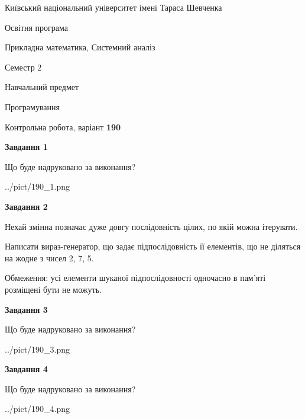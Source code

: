 \documentclass[12pt, ukrainian]{article}
\begin{document}
{{\begin {small}\par
{ \center  Київський національний університет імені Тараса Шевченка \par}
{\parbox {5 cm}{Освітня програма \hfill}{\parbox {8 cm}{Прикладна математика, Системний аналіз \hfill}}\parbox {5 cm}{\hfill Семестр 2}}\par
{\parbox {5 cm} {Навчальний предмет \hfill}\parbox {7 cm}{Програмування \hfill}\parbox {6cm}{\hfill}\par}\vspace{-7pt} \end{small}}{\center Контрольна робота, варіант  \No \textbf
{ 190 }\par}}
{
\begin {large}
{\begin {center}\textbf{Завдання 1}\end {center}}\par
Що буде надруковано за виконання?\par\par
\begin{center}
	{../pict/190_1.png}
\end{center}
\newpage

{\begin {center}\textbf{Завдання 2}\end {center}}\par
Нехай змінна  позначає дуже довгу послідовність цілих, по якій можна ітерувати.

Написати вираз-генератор, що задає підпослідовність її елементів, що не діляться на жодне з чисел 2, 7, 5.

Обмеження: усі елементи шуканої підпослідовності одночасно в пам'яті розміщені бути не можуть.\par
\newpage

{\begin {center}\textbf{Завдання 3}\end {center}}\par
Що буде надруковано за виконання?\par
\begin{center}
	{../pict/190_3.png}
\end{center}
\newpage

{\begin {center}\textbf{Завдання 4}\end {center}}\par
Що буде надруковано за виконання?\par
\begin{center}
	{../pict/190_4.png}
\end{center}
\newpage


\end{large}}
\end{document}
